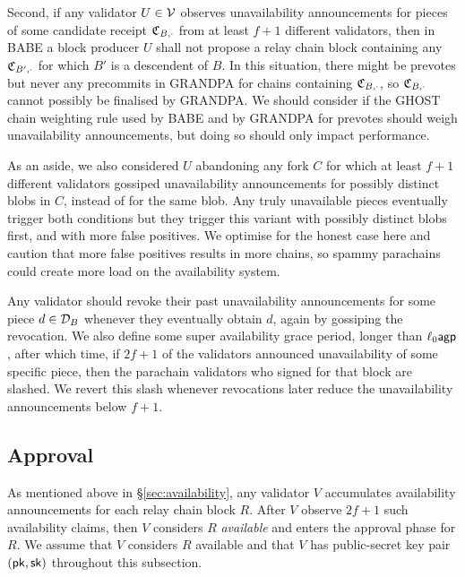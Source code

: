 Second, if any validator $U \in \mathcal{V}$ observes unavailability announcements for pieces of some candidate receipt $\mathfrak{C}_{B,\cdot}$ from at least $f+1$ different validators, then in BABE a block producer $U$ shall not propose a relay chain block containing any $\mathfrak{C}_{B',\cdot}$ for which $B'$ is a descendent of $B$.
In this situation, there might be prevotes but never any precommits in GRANDPA for chains containing  $\mathfrak{C}_{B,\cdot}$, so $\mathfrak{C}_{B,\cdot}$ cannot possibly be finalised by GRANDPA.  We should consider if the GHOST chain weighting rule used by BABE and by GRANDPA for prevotes should weigh unavailability announcements, but doing so should only impact performance.

As an aside, we also considered $U$ abandoning any fork $C$ for which at least $f+1$ different validators gossiped unavailability announcements for possibly distinct blobs in $C$, instead of for the same blob.  Any truly unavailable pieces eventually trigger both conditions but they trigger this variant with possibly distinct blobs first, and with more false positives.  We optimise for the honest case here and caution that more false positives results in more chains, so spammy parachains could create more load on the availability system.

Any validator should revoke their past unavailability announcements for some piece $d \in \mathcal{D}_B$ whenever they eventually obtain $d$, again by gossiping the revocation.  We also define some super availability grace period, longer than $\ell_0 \mathsf{agp}$, after which time, if $2f+1$ of the validators announced unavailability of some specific piece, then the parachain validators who signed for that block are slashed.
We revert this slash whenever revocations later reduce the unavailability announcements below $f+1$.


\subsection{Approval} %
\label{sec:approval}

As mentioned above in \S\ref{sec:availability}, any validator $V$ accumulates availability announcements for each relay chain block $R$.  After $V$ observe $2f+1$ such availability claims, then $V$ considers $R$ {\em available} and enters the approval phase for $R$.  We assume that $V$ considers $R$ available and that $V$ has public-secret key pair $(\mathsf{pk},\mathsf{sk})$ throughout this subsection.

